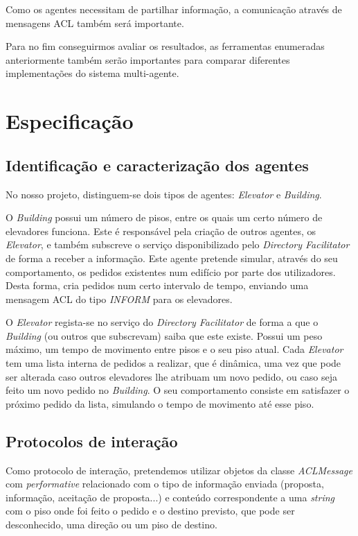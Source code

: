 \documentclass[a4paper]{article}
\begin{document}
Como os agentes necessitam de partilhar informação, a comunicação através de mensagens ACL também será importante.

Para no fim conseguirmos avaliar os resultados, as ferramentas enumeradas anteriormente também serão importantes para comparar diferentes implementações do sistema multi-agente.

\newpage

\section{Especificação}

\subsection{Identificação e caracterização dos agentes} 

No nosso projeto, distinguem-se dois tipos de agentes: \textit{Elevator} e \textit{Building}.

O \textit{Building} possui um número de pisos, entre os quais um certo número de elevadores funciona. Este é responsável pela criação de outros agentes, os \textit{Elevator}, e também subscreve o serviço disponibilizado pelo \textit{Directory Facilitator} de forma a receber a informação. Este agente pretende simular, através do seu comportamento, os pedidos existentes num edifício por parte dos utilizadores. Desta forma, cria pedidos num certo intervalo de tempo, enviando uma mensagem ACL do tipo \textit{INFORM} para os elevadores.

O \textit{Elevator} regista-se no serviço do \textit{Directory Facilitator} de forma a que o \textit{Building} (ou outros que subscrevam) saiba que este existe. Possui um peso máximo, um tempo de movimento entre pisos e o seu piso atual. Cada \textit{Elevator} tem uma lista interna de pedidos a realizar, que é dinâmica, uma vez que pode ser alterada caso outros elevadores lhe atribuam um novo pedido, ou caso seja feito um novo pedido no \textit{Building}. O seu comportamento consiste em satisfazer o próximo pedido da lista, simulando o tempo de movimento até esse piso.

\subsection{Protocolos de interação} 

Como protocolo de interação, pretendemos utilizar objetos da classe \textit{ACLMessage} com \textit{performative} relacionado com o tipo de informação enviada (proposta, informação, aceitação de proposta...) e conteúdo correspondente a uma \textit{string} com o piso onde foi feito o pedido e o destino previsto, que pode ser desconhecido, uma direção ou um piso de destino.
\end{document}
